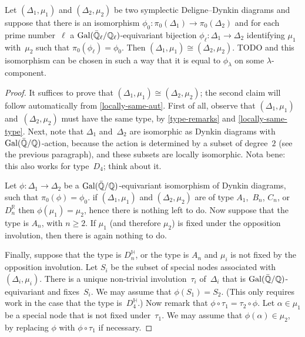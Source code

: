\documentclass[10pt,twoside,leqno]{article}
\numberwithin{equation}{subsection}
\newcommand{\QQ}{\mathbb{Q}}
\newcommand{\QQbar}{\bar{\QQ}}
\newcommand{\QQl}{\QQ_{\ell}}
\newcommand{\QQlbar}{\QQbar_{\ell}}
\newcommand{\RR}{\mathbb{R}}
\newcommand{\HQ}{\mathbb{H}}
\newcommand{\Gal}{\textnormal{Gal}}
\begin{document}
\begin{proposition} %
 \label{deldyn-local-global}
 Let $(\Delta_1, \mu_1)$ and $(\Delta_2, \mu_2)$ be
 two symplectic Deligne--Dynkin diagrams
 and suppose that there is an isomorphism
 $\phi_0 \colon \pi_0(\Delta_1) \to \pi_0(\Delta_2)$
 and for each prime number~$\ell$
 a $\Gal(\QQlbar/\QQl)$-equivariant bijection
 $\phi_\ell \colon \Delta_1 \to \Delta_2$ identifying $\mu_1$ with~$\mu_2$
 such that $\pi_0(\phi_\ell) = \phi_0$.
 Then $(\Delta_1, \mu_1) \cong (\Delta_2, \mu_2)$.
 TODO and this isomorphism can be chosen %
 in such a way that it is equal to $\phi_\lambda$
 on some $\lambda$-component.
 \begin{proof}
  It suffices to prove that $(\Delta_1, \mu_1) \cong (\Delta_2, \mu_2)$;
  the second claim will follow automatically from \cref{locally-same-aut}.
  First of all, observe that $(\Delta_1,\mu_1)$ and~$(\Delta_2,\mu_2)$
  must have the same type, by \cref{type-remarks} and \cref{locally-same-type}.
  Next, note that $\Delta_1$ and~$\Delta_2$ are isomorphic
  as Dynkin diagrams with $\Gal(\QQbar/\QQ)$-action,
  because the action is determined by a subset of degree~$2$
  (see the previous paragraph),
  and these subsets are locally isomorphic.
  Nota bene: this also works for type~$D_4$;
  think about it.

  Let $\phi \colon \Delta_1 \to \Delta_2$ be a $\Gal(\QQbar/\QQ)$-equivariant
  isomorphism of Dynkin diagrams, such that $\pi_0(\phi) = \phi_0$.
  if $(\Delta_1,\mu_1)$ and $(\Delta_2,\mu_2)$
  are of type $A_1$,~$B_n$, $C_n$, or~$D_n^\RR$ then $\phi(\mu_1) = \mu_2$,
  hence there is nothing left to do.
  Now suppose that the type is $A_n$, with $n \ge 2$.
  If $\mu_1$ (and therefore $\mu_2$) is fixed
  under the opposition involution,
  then there is again nothing to do.

  Finally, suppose that the type is $D_n^\HQ$,
  or the type is $A_n$ and $\mu_i$ is not fixed by the opposition involution.
  Let $S_i$ be the subset of special nodes associated with~$(\Delta_i,\mu_i)$.
  There is a unique non-trivial involution~$\tau_i$ of~$\Delta_i$
  that is $\Gal(\QQbar/\QQ)$-equivariant and fixes~$S_i$.
  We may assume that $\phi(S_1) = S_2$.
  (This only requires work in the case that the type is~$D_4^\HQ$.)
  Now remark that $\phi \circ \tau_1 = \tau_2 \circ \phi$.
  Let $\alpha \in \mu_1$ be a special node that is not fixed under~$\tau_1$.
  We may assume that $\phi(\alpha) \in \mu_2$,
  by replacing $\phi$ with $\phi \circ \tau_1$ if necessary.
  

\end{proof}
\end{proposition}
\end{document}
